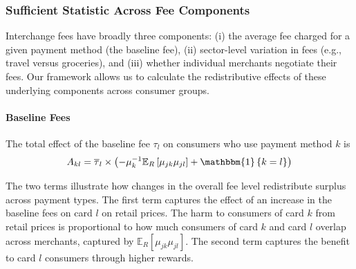 \documentclass[main.tex]{subfiles}
\begin{document}


\subsubsection{Sufficient Statistic Across Fee Components}\label{cor:fee-components}

Interchange fees have broadly three components: (i) the average fee charged for a given payment method (the baseline fee), (ii) sector-level variation in fees (e.g., travel versus groceries), and (iii) whether individual merchants negotiate their fees.
Our framework allows us to calculate the redistributive effects of these underlying components across consumer groups.

\paragraph{Baseline Fees}

The total effect of the baseline fee $\tau_l$ on consumers who use payment method $k$ is
\begin{equation}
A_{kl}=\overline{\tau}_{l}\times\left(- \mu_k^{-1} \mathbb{E}_{R}\left[\mu_{jk}\mu_{jl}\right] + \mathbbm{1}\left\{ k=l\right\}\right)\label{eq:baseline-effect}
\end{equation}

The two terms illustrate how changes in the overall fee level redistribute surplus across payment types.
The first term captures the effect of an increase in the baseline fees on card $l$ on retail prices.
The harm to consumers of card $k$ from retail prices is proportional to how much consumers of card $k$ and card $l$ overlap across merchants, captured by $\mathbb{E}_{R}[\mu_{jk}\mu_{jl}]$.
The second term captures the benefit to card $l$ consumers through higher rewards.
\end{document}
